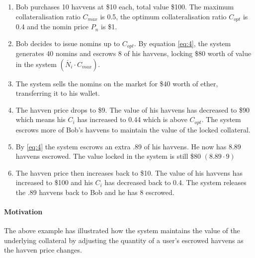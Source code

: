 \begin{enumerate}
\item{Bob purchases 10 havvens at \$10 each, total value \$100. The maximum collateralisation ratio $C_{max}$ is 0.5, the optimum collateralisation ratio $C_{opt}$ is 0.4 and the nomin price $P_n$ is \$1.}
\item{Bob decides to issue nomins up to $C_{opt}$. By equation \eqref{eq:4}, the system generates 40 nomins and escrows 8 of his havvens, locking \$80 worth of value in the system $ (\check{N_i} \cdot C_{max})$.}
\item{The system sells the nomins on the market for \$40 worth of ether, transferring it to his wallet}.
\item{The havven price drops to \$9. The value of his havvens has decreased to \$90 which means his $C_i$ has increased to 0.44 which is above $C_{opt}$. The system escrows more of Bob's havvens to maintain the value of the locked collateral.}
\item{By \eqref{eq:4} the system escrows an extra .89 of his havvens. He now has 8.89 havvens escrowed. The value locked in the system is still \$80 $(8.89 \cdot 9)$}
\item{The havven price then increases back to \$10. The value of his havvens has increased to \$100 and his $C_i$ has decreased back to 0.4. The system releases the .89 havvens back to Bob and he has 8 escrowed.}
\end{enumerate}

\paragraph{Motivation} The above example has illustrated how the system maintains the value of the underlying collateral by adjusting the quantity of a user's escrowed havvens as the havven price changes.




